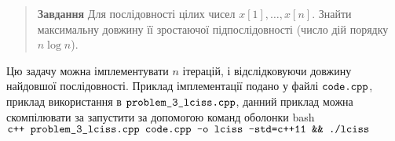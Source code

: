\begin{center}
  \Large{}
\end{center}


\begin{quote} \textbf{Завдання} Для послідовності цілих чисел $x[1], … , x[n]$. Знайти максимальну довжину її зростаючої підпослідовності (число дій порядку $n\log{n}$).
\end{quote}


Цю задачу можна імплементувати $n$ ітерацій, і відслідковуючи довжину найдовшої послідовності. Приклад імплементації подано у файлі $\normalsize\texttt{code.cpp}$, приклад використання в $\normalsize\texttt{problem\_3\_lciss.cpp}$, данний приклад можна скомпілювати за запустити за допомогою команд оболонки bash \\  $\normalsize\texttt{c++ problem\_3\_lciss.cpp code.cpp -o lciss -std=c++11 \&\& ./lciss}$
